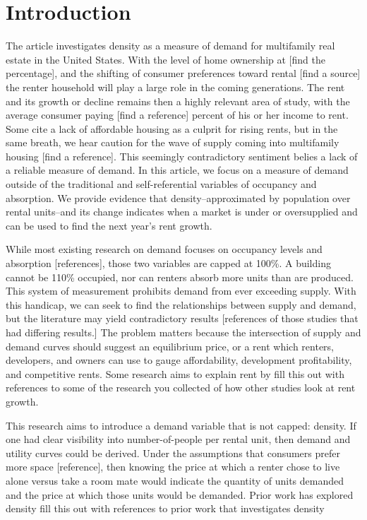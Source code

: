 \documentclass[sn-mathphys-num]{sn-jnl}%
\theoremstyle{thmstyleone}%
\theoremstyle{thmstyletwo}%
\theoremstyle{thmstylethree}%
\begin{document}
\section{Introduction}\label{sec1}

The article investigates density as a measure of demand for multifamily real estate in the United States. With the level of home ownership at [find the percentage], and the shifting of consumer preferences toward  rental [find a source] the renter household will play a large role in the coming generations. The rent and its growth or decline remains then a highly relevant area of study, with the average consumer paying [find a reference] percent of his or her income to rent. Some cite a lack of affordable housing as a culprit for rising rents, but in the same breath, we hear caution for the wave of supply coming into multifamily housing [find a reference]. This seemingly contradictory sentiment belies a lack of a reliable measure of demand. In this article, we focus on a measure of demand outside of the traditional and self-referential variables of occupancy and absorption. We provide evidence that density--approximated by population over rental units--and its change indicates when a market is under or oversupplied and can be used to find the next year's rent growth. 

While most existing research on demand focuses on occupancy levels and absorption [references], those two variables are capped at 100\%. A building cannot be 110\% occupied, nor can renters absorb more units than are produced. This system of measurement prohibits demand from ever exceeding supply. With this handicap, we can seek to find the relationships between supply and demand, but the literature may yield contradictory results [references of those studies that had differing results.] The problem matters because the intersection of supply and demand curves should suggest an equilibrium price, or a rent which  renters, developers, and owners can use to gauge affordability, development profitability, and competitive rents. Some research aims to explain rent by 
fill this out with references to some of the research you collected of how other studies look at rent growth. 

This research aims to introduce a demand variable that is not capped: density. If one had clear visibility into number-of-people per rental unit, then demand and utility curves could be derived. Under the assumptions that consumers prefer more space [reference], then knowing the price at which a renter chose to live alone versus take a room mate would indicate the quantity of units demanded and the price at which those units would be demanded. Prior work has explored density
fill this out with references to prior work that investigates density
\end{document}

